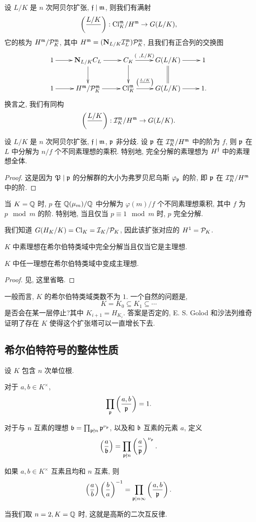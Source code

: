 \begin{theorem}{}{}
设 $L/K$ 是 $n$ 次阿贝尔扩张, ${\mathfrak{f}}\mid{\mathfrak{m}}$, 则我们有满射
  \[\left(\frac{{L/K}}{~}\right):{\mathrm{Cl}}_K^{\mathfrak{m}}/H^{\mathfrak{m}}\rightarrow G(L/K),\]
它的核为 $H^{\mathfrak{m}}/{\mathcal{P}}_K^{\mathfrak{m}}$, 其中 $H^{\mathfrak{m}}=({\mathbf{N}}_{L/K}{\mathcal{I}}_L^{\mathfrak{m}}){\mathcal{P}}_K^{\mathfrak{m}}$, 且我们有正合列的交换图
  \[\xymatrix{
    1\ar[r]&\bfN_{L/K}C_L\ar[r]\ar[d]&C_K\ar[r]^-{(~,L/K)}\ar[d]&G(L/K)\ar[r]\ar@{=}[d]&1\\
    1\ar[r]&H^\fm/\CP_K^\fm\ar[r]&\Cl_K^\fm\ar[r]^-{\leg{L/K}{~}}&G(L/K)\ar[r]&1.
  }\]
换言之, 我们有同构
  \[\left(\frac{{L/K}}{~}\right):{\mathcal{I}}_K^{\mathfrak{m}}/H^{\mathfrak{m}}\rightarrow G(L/K).\]
\end{theorem}

\begin{theorem}{}{}
设 $L/K$ 是 $n$ 次阿贝尔扩张, ${\mathfrak{f}}\mid{\mathfrak{m}}$, ${\mathfrak{p}}$ 非分歧.
设 ${\mathfrak{p}}$ 在 ${\mathcal{I}}^{\mathfrak{m}}_K/H^{\mathfrak{m}}$ 中的阶为 $f$, 则 ${\mathfrak{p}}$ 在 $L$ 中分解为 $n/f$ 个不同素理想的乘积. 特别地, 完全分解的素理想为 $H^{\mathfrak{f}}$ 中的素理想全体.
\end{theorem}
\begin{proof}
这是因为 ${\mathfrak{P}}\mid{\mathfrak{p}}$ 的分解群的大小为弗罗贝尼乌斯 $\varphi_{\mathfrak{p}}$ 的阶, 即 ${\mathfrak{p}}$ 在 ${\mathcal{I}}^{\mathfrak{m}}_K/H^{\mathfrak{m}}$ 中的阶.
\end{proof}

\begin{example}
当 $K={\mathbb{Q}}$ 时, $p$ 在 ${\mathbb{Q}}(\mu_m)/{\mathbb{Q}}$ 中分解为 $\varphi(m)/f$ 个不同素理想乘积, 其中 $f$ 为 $p\mod m$ 的阶. 特别地, 当且仅当 $p\equiv 1\mod m$ 时, $p$ 完全分解.
\end{example}

我们知道 $G(H_K/K)={\mathrm{Cl}}_K={\mathcal{I}}_K/{\mathcal{P}}_K$, 因此该扩张对应的 $H^1={\mathcal{P}}_K$.
\begin{corollary}{}{}
$K$ 中素理想在希尔伯特类域中完全分解当且仅当它是主理想.
\end{corollary}

\begin{theorem}{}{}
$K$ 中任一理想在希尔伯特类域中变成主理想.
\end{theorem}
\begin{proof}
见\cite[Chapter VI, Proposition~7.5]{Neukirch1999}, 这里省略.
\end{proof}

一般而言, $K$ 的希尔伯特类域类数不为 $1$. 
一个自然的问题是, 
  \[K=K_0\subseteq K_1\subseteq \cdots\]
是否会在某一层停止?其中 $K_{i+1}=H_{K_i}$. 答案是否定的, E. S. Golod 和沙法列维奇证明了存在 $K$ 使得这个扩张塔可以一直增长下去.


\subsection{希尔伯特符号的整体性质}
设 $K$ 包含 $n$ 次单位根.
\begin{proposition}{}{}
对于 $a,b\in K^\times$,
  \[\prod_{\mathfrak{p}} \left(\frac{{a},{b}}{{\mathfrak{p}}}\right)=1.\]
\end{proposition}
对于与 $n$ 互素的理想 ${\mathfrak{b}}=\prod_{{\mathfrak{p}}\nmid n}{\mathfrak{p}}^{\nu_{\mathfrak{p}}}$, 以及和 ${\mathfrak{b}}$ 互素的元素 $a$, 定义 
  \[\left(\frac{{a}}{{\mathfrak{b}}}\right)=\prod_{{\mathfrak{p}}\nmid n}\left(\frac{{a}}{{\mathfrak{p}}}\right)^{\nu_{\mathfrak{p}}}.\]
\begin{theorem}{}{}
如果 $a,b\in K^\times$ 互素且均和 $n$ 互素, 则
  \[\left(\frac{{a}}{b}\right)\left(\frac{{b}}{a}\right)^{-1}=\prod_{{\mathfrak{p}}\mid n\infty}\left(\frac{{a},{b}}{{\mathfrak{p}}}\right).\]
\end{theorem}
当我们取 $n=2, K={\mathbb{Q}}$ 时, 这就是高斯的二次互反律.


